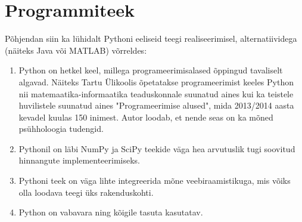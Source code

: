\documentclass[a4paper,12pt,oneside]{article}
\numberwithin{equation}{section}
\theoremstyle{definition}
\begin{document}

\section{Programmiteek}

Põhjendan siin ka lühidalt Pythoni eeliseid teegi realiseerimisel, alternatiividega (näiteks Java või MATLAB) võrreldes:
\begin{enumerate}
\item Python on hetkel keel, millega programeerimisalased õppingud tavaliselt algavad. Näiteks Tartu Ülikoolis õpetatakse programeerimist keeles Python nii matemaatika-informaatika teaduskonnale suunatud aines kui ka teistele huvilistele suunatud aines "Programeerimise alused", mida 2013/2014 aasta kevadel kuulas 150 inimest. Autor loodab, et nende seas on ka mõned psühholoogia tudengid.
\item Pythonil on läbi NumPy ja SciPy teekide väga hea arvutuslik tugi soovitud hinnangute implementeerimiseks.
\item Pythoni teek on väga lihte integreerida mõne veebiraamistikuga, mis võiks olla loodava teegi üks rakenduskohti.
\item Python on vabavara ning kõigile tasuta kasutatav.
\end{enumerate}
\end{document}
